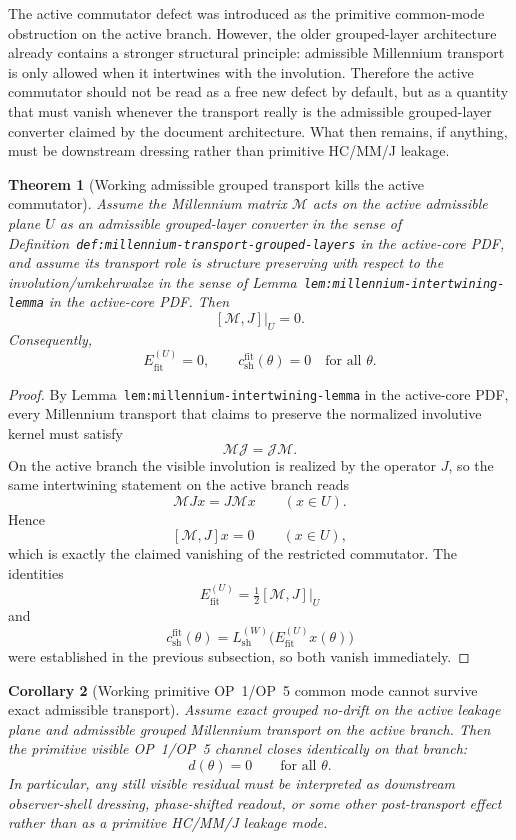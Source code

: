 \documentclass[12pt,a4paper]{article}
\newtheorem{theorem}{Theorem}[section]
\newtheorem{corollary}[theorem]{Corollary}
\begin{document}
The active commutator defect was introduced as the primitive common-mode obstruction on the active branch. However, the older grouped-layer architecture already contains a stronger structural principle: admissible Millennium transport is only allowed when it intertwines with the involution. Therefore the active commutator should not be read as a free new defect by default, but as a quantity that must vanish whenever the transport really is the admissible grouped-layer converter claimed by the document architecture. What then remains, if anything, must be downstream dressing rather than primitive HC/MM/J leakage.

\begin{theorem}[Working admissible grouped transport kills the active commutator]
Assume the Millennium matrix $\mathcal M$ acts on the active admissible plane $U$ as an admissible grouped-layer converter in the sense of Definition~\texttt{def:millennium-transport-grouped-layers} in the active-core PDF, and assume its transport role is structure preserving with respect to the involution/umkehrwalze in the sense of Lemma~\texttt{lem:millennium-intertwining-lemma} in the active-core PDF. Then
\[
 [\mathcal M,J]\big|_{U}=0.
\]
Consequently,
\[
 E_{\mathrm{fit}}^{(U)}=0,
 \qquad
 c_{\mathrm{sh}}^{\mathrm{fit}}(\theta)=0
 \quad\text{for all }\theta.
\]
\end{theorem}

\begin{proof}
By Lemma~\texttt{lem:millennium-intertwining-lemma} in the active-core PDF, every Millennium transport that claims to preserve the normalized involutive kernel must satisfy
\[
 \mathcal M\mathcal J=\mathcal J\mathcal M.
\]
On the active branch the visible involution is realized by the operator $J$, so the same intertwining statement on the active branch reads
\[
 \mathcal M Jx=J\mathcal M x
 \qquad (x\in U).
\]
Hence
\[
 [\mathcal M,J]x=0
 \qquad (x\in U),
\]
which is exactly the claimed vanishing of the restricted commutator. The identities
\[
 E_{\mathrm{fit}}^{(U)}=\tfrac12[\mathcal M,J]\big|_{U}
\]
and
\[
 c_{\mathrm{sh}}^{\mathrm{fit}}(\theta)=L_{\mathrm{sh}}^{(W)}\bigl(E_{\mathrm{fit}}^{(U)}x(\theta)\bigr)
\]
were established in the previous subsection, so both vanish immediately.
\end{proof}

\begin{corollary}[Working primitive OP~1/OP~5 common mode cannot survive exact admissible transport]
Assume exact grouped no-drift on the active leakage plane and admissible grouped Millennium transport on the active branch. Then the primitive visible OP~1/OP~5 channel closes identically on that branch:
\[
 d(\theta)=0
 \qquad\text{for all }\theta.
\]
In particular, any still visible residual must be interpreted as downstream observer-shell dressing, phase-shifted readout, or some other post-transport effect rather than as a primitive HC/MM/J leakage mode.
\end{corollary}
\end{document}
